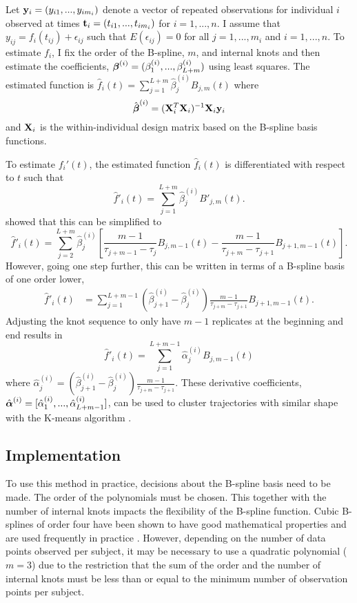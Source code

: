 Let $\mathbf y_{i}=(y_{i1},...,y_{im_{i}})$ denote a vector of repeated observations for individual $i$ observed at times $\mathbf t_{i}=(t_{i1},...,t_{im_{i}})$  for $i=1,...,n$. I assume that $y_{ij} = f_{i}(t_{ij}) + \epsilon_{ij}$ such that $E(\epsilon_{ij}) = 0$ for all $j=1,...,m_{i}$ and $i=1,...,n$.  To estimate $f_{i}$, I fix the order of the B-spline, $m$, and internal knots and then estimate the coefficients, $\boldsymbol \beta^{(i)} = (\beta^{(i)}_1,...,\beta^{(i)}_{L+m})$ using least squares. The estimated function is $\hat{f}_i(t)=\sum^{L+m}_{j=1} \hat{\beta}^{(i)}_j B_{j,m}(t)$ where
$$\hat{\boldsymbol \beta}^{(i)} = (\mathbf X_{i}^{T}\mathbf X_{i})^{-1}\mathbf X_{i}\mathbf y_{i}$$
and $\mathbf X_{i}$ is the within-individual design matrix based on the B-spline basis functions. 

To estimate $f_i'(t)$, the estimated function $\hat{f}_i(t)$ is differentiated with respect to $t$ such that
$$\hat{f}'_i(t)=\sum^{L+m}_{j=1} \hat{\beta}^{(i)}_j B'_{j,m}(t).$$
\Textcite{prochazkova2005} showed that this can be simplified to
$$\hat{f}'_i(t)=\sum^{L+m}_{j=2} \hat{\beta}^{(i)}_j \left[\frac{m-1}{\tau_{j+m-1}-\tau_j} B_{j,m-1}(t)-\frac{m-1}{\tau_{j+m}-\tau_{j+1}} B_{j+1,m-1}(t)\right].$$
However, going one step further, this can be written in terms of a B-spline basis of one order lower,
\begin{align*}
\hat{f}'_i(t)&=\sum^{L+m-1}_{j=1} (\hat{\beta}^{(i)}_{j+1} -\hat{\beta}^{(i)}_j)\frac{m-1}{\tau_{j+m}-\tau_{j+1} }B_{j+1,m-1}(t).
\end{align*}
Adjusting the knot sequence to only have $m-1$ replicates at the beginning and end results in
$$\hat{f}'_i(t)=\sum^{L+m-1}_{j=1}\hat{\alpha}^{(i)}_jB_{j,m-1}(t)$$
where $\hat{\alpha}^{(i)}_j= (\hat{\beta}^{(i)}_{j+1} -\hat{\beta}^{(i)}_j)\frac{m-1}{\tau_{j+m}-\tau_{j+1} }$.
These derivative coefficients, $\hat{\boldsymbol \alpha}^{(i)} = [\hat{\alpha}^{(i)}_1,...,\hat{\alpha}^{(i)}_{ L+m-1}]$, can be used to cluster trajectories with similar shape with the K-means algorithm \cite{macqueen1967, hartigan1979}. 

\subsection{Implementation}
To use this method in practice, decisions about the B-spline basis need to be made. The order of the polynomials must be chosen. This together with the number of internal knots impacts the flexibility of the B-spline function. Cubic B-splines of order four have been shown to have good mathematical properties and are used frequently in practice \cite{james2003}. However, depending on the number of data points observed per subject, it may be necessary to use a quadratic polynomial ($m = 3$) due to the restriction that the sum of the order and the number of internal knots must be less than or equal to the minimum number of observation points per subject. 

